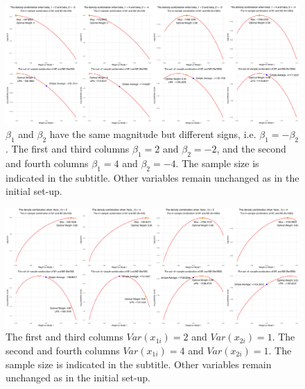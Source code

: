 \documentclass{monashthesis}
\begin{document}
\begin{figure}[ht]
\centering
\includegraphics[scale=0.18, angle=90]{figures/betasign11.jpg}
\caption{$\beta_1$ and $\beta_2$ have the same magnitude but different signs, i.e. $\beta_1=-\beta_2$. The first and third columns $\beta_1=2$ and $\beta_2=-2$, and the second and fourth columns $\beta_1=4$ and $\beta_2=-4$. The sample size is indicated in the subtitle. Other variables remain unchanged as in the initial set-up.}
\label{fig:sign}
\end{figure}

\begin{figure}[ht]
\centering
\includegraphics[scale=0.18, angle=90]{figures/var11.jpg}
\caption{The first and third columns $Var(x_{1i}) = 2$ and $Var(x_{2i}) = 1$. The second and fourth columns $Var(x_{1i}) = 4$ and $Var(x_{2i}) = 1$. The sample size is indicated in the subtitle. Other variables remain unchanged as in the initial set-up.}
\label{fig:variance}
\end{figure}

\printbibliography[title={Reference}]
\end{document}
